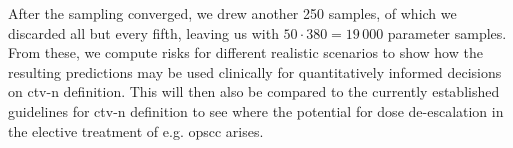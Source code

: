 \documentclass[\relativeRoot/main.tex]{subfiles}
\begin{document}
After the sampling converged, we drew another 250 samples, of which we discarded all but every fifth, leaving us with $50 \cdot 380 = 19\,000$ parameter samples. From these, we compute risks for different realistic scenarios to show how the resulting predictions may be used clinically for quantitatively informed decisions on \acrfull{ctv-n} definition. This will then also be compared to the currently established guidelines for \gls{ctv-n} definition to see where the potential for dose de-escalation in the elective treatment of e.g. \gls{opscc} arises.









\end{document}
